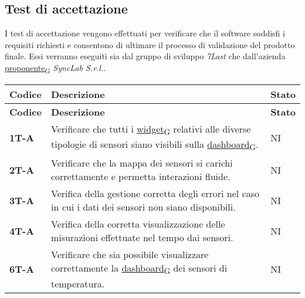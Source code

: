 \subsection{Test di accettazione}
I test di accettazione vengono effettuati per verificare che il software soddisfi i requisiti richiesti e consentono di ultimare il processo di validazione del prodotto finale.
Essi verranno eseguiti sia dal gruppo di sviluppo \textit{7Last} che dall'azienda \href{https://7last.github.io/docs/pb/documentazione-interna/glossario\#proponente}{proponente\textsubscript{G}} \textit{SyncLab S.r.l.}. \\
\begin{longtable}{|>{\raggedright\arraybackslash}m{}|>{\raggedright\arraybackslash}m{}|>{\raggedright\arraybackslash}m{}|}
	\hline
	\textbf{Codice} & \textbf{Descrizione}                                                                                                   & \textbf{Stato} \\
	\hline
	\endfirsthead
	\hline
	\textbf{Codice} & \textbf{Descrizione}                                                                                                   & \textbf{Stato} \\
	\endhead
	\textbf{1T-A}   & Verificare che tutti i \href{https://7last.github.io/docs/pb/documentazione-interna/glossario\#widget}{widget\textsubscript{G}} relativi alle diverse tipologie di sensori siano visibili sulla \href{https://7last.github.io/docs/pb/documentazione-interna/glossario\#dashboard}{dashboard\textsubscript{G}}.               & NI             \\
	\hline
	\textbf{2T-A}   & Verificare che la mappa dei sensori si carichi correttamente e permetta interazioni fluide.                            & NI             \\
	\hline
	\textbf{3T-A}   & Verifica della gestione corretta degli errori nel caso in cui i dati dei sensori non siano disponibili.                & NI             \\
	\hline
	\textbf{4T-A}   & Verifica della corretta visualizzazione delle misurazioni effettuate nel tempo dai sensori.                            & NI             \\
	\hline
	\textbf{6T-A}   & Verificare che sia possibile visualizzare correttamente la \href{https://7last.github.io/docs/pb/documentazione-interna/glossario\#dashboard}{dashboard\textsubscript{G}} dei sensori di temperatura.                       & NI             \\

\end{longtable}
